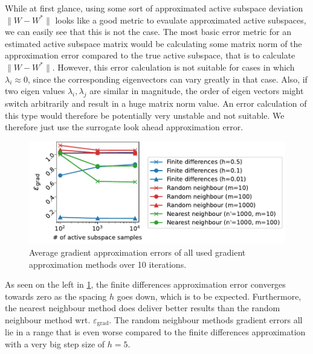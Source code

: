 \documentclass[
  a4paper,  %
  twoside,  %
  bibliography=totoc,
  headsepline,
  cleardoublepage=empty,
  parskip=half,
  draft=false
]{scrbook}
\begin{document}
While at first glance, using some sort of approximated active subspace deviation $\| W - W^\ast \|$ looks like a good metric to evaulate approximated active subspaces, we can easily see that this is not the case.
The most basic error metric for an estimated active subspace matrix would be calculating some matrix norm of the approximation error compared to the true active subspace, that is to calculate $\| W - W^\ast \|$.
However, this error calculation is not suitable for cases in which $\lambda_i \approx 0$, since the corresponding eigenvectors can vary greatly in that case.
Also, if two eigen values $\lambda_i, \lambda_j$ are similar in magnitude, the order of eigen vectors might switch arbitrarily and result in a huge matrix norm value.
An error calculation of this type would therefore be potentially very unstable and not suitable.
We therefore just use the surrogate look ahead approximation error.

\begin{mdframed}[style=style]
\begin{figure}[H]
	\includegraphics[width=\textwidth]{graphics/ishigami_as_grad_errors}
\delimit
	\caption{Average gradient approximation errors of all used gradient approximation methods over 10 iterations.}
	\label{fig:ishigami_as_grad}
\end{figure}
\end{mdframed}
%
As seen on the left in \cref{fig:ishigami_as_grad}, the finite differences approximation error converges towards zero as the spacing $h$ goes down, which is to be expected.
Furthermore, the nearest neighbour method does deliver better results than the random neighbour method wrt. $\varepsilon_{\mathrm{grad}}$.
The random neighbour methods gradient errors all lie in a range that is even worse compared to the finite differences approximation with a very big step size of $h=5$.
\end{document}
